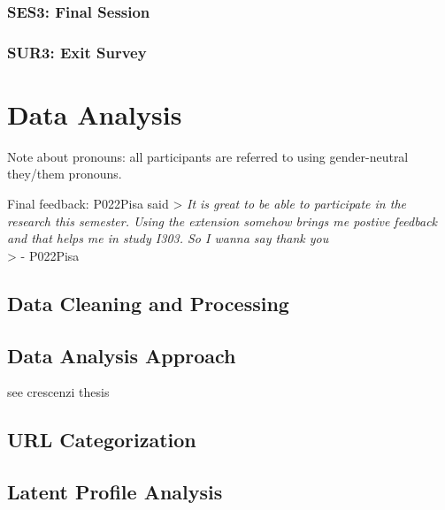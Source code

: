 \documentclass[a4paper, nobind]{templates/ociamthesis}
\begin{document}
\hypertarget{ses3-final-session}{%
\subsection{SES3: Final Session}\label{ses3-final-session}}

\hypertarget{sur3-exit-survey}{%
\subsection{SUR3: Exit Survey}\label{sur3-exit-survey}}

\hypertarget{data-analysis}{%
\chapter{Data Analysis}\label{data-analysis}}

Note about pronouns:
all participants are referred to using gender-neutral they/them pronouns.

Final feedback:
P022Pisa said
\textgreater{} \emph{It is great to be able to participate in the research this semester. Using the extension somehow brings me postive feedback and that helps me in study I303. So I wanna say thank you}\\
\textgreater{} - P022Pisa

\hypertarget{data-cleaning-and-processing}{%
\section{Data Cleaning and Processing}\label{data-cleaning-and-processing}}

\hypertarget{data-analysis-approach}{%
\section{Data Analysis Approach}\label{data-analysis-approach}}

see crescenzi thesis

\hypertarget{url-categorization}{%
\section{URL Categorization}\label{url-categorization}}

\hypertarget{latent-profile-analysis}{%
\section{Latent Profile Analysis}\label{latent-profile-analysis}}
\end{document}
